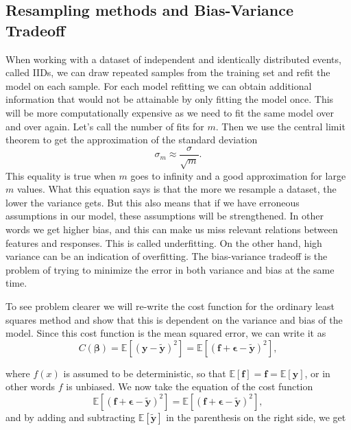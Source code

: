 \subsection{Resampling methods and Bias-Variance Tradeoff}
When working with a dataset of independent and identically distributed events, called IIDs, we can draw repeated samples from the training set and refit the model on each sample. For each model refitting we can obtain additional information that would not be attainable by only fitting the model once. This will be more computationally expensive as we need to fit the same model over and over again. Let's call the number of fits for $m$. Then we use the central limit theorem to get the approximation of the standard deviation
\begin{equation}\label{eq:central_limit_deviation}
\sigma_m\approx
\frac{\sigma}{\sqrt{m}}.
\end{equation}
This equality is true when $m$ goes to infinity and a good approximation for large $m$ values. What this equation says is that the more we resample a dataset, the lower the variance gets. But this also means that if we have erroneous assumptions in our model, these assumptions will be strengthened. In other words we get higher bias, and this can make us miss relevant relations between features and responses. This is called underfitting. On the other hand, high variance can be an indication of overfitting. The bias-variance tradeoff is the problem of trying to minimize the error in both variance and bias at the same time. 

To see problem clearer we will re-write the cost function for the ordinary least squares method and show that this is dependent on the variance and bias of the model. Since this cost function is the mean squared error, we can write it as
$$
C(\boldsymbol\beta) = \mathbb{E}\left[(\mathbf{y}-\mathbf{\tilde{y}})^2\right] = \mathbb{E}\left[(\mathbf{f}+\mathbf{\epsilon}-\mathbf{\tilde{y}})^2\right],
$$

where $f(x)$ is assumed to be deterministic, so that $\mathbb{E}[\mathbf{f}]=\mathbf{f}=\mathbb{E}[\mathbf{y}]$, or in other words $f$ is unbiased. We now take the equation of the cost function
$$
\mathbb{E}\left[(\mathbf{f}+\mathbf{\epsilon}-\mathbf{\tilde{y}})^2\right]=\mathbb{E}\left[(\mathbf{f}+\mathbf{\epsilon}-\mathbf{\tilde{y}})^2\right],
$$
and by adding and subtracting $\mathbb{E}\left[\mathbf{\tilde{y}}\right]$ in the parenthesis on the right side, we get

